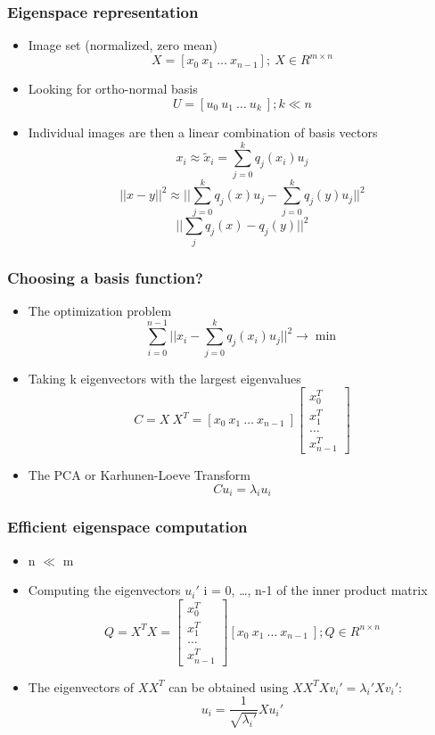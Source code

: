 \documentclass[10pt]{beamer}
\begin{document}
\begin{frame}
  \frametitle{Eigenspace representation}
  \begin{itemize}
  \item Image set (normalized, zero mean)
    \[ X = [ x_0 ~ x_1 ~ \ldots ~  x_{n-1} ] ; ~ X \in R^{m \times n} \]
  \item Looking for ortho-normal basis
    \[ U = [ u_0 ~ u_1 ~ \ldots ~ u_k ~ ] ; k \ll n \]
  \item Individual images are then a linear combination of basis vectors
    \[ x_i \approx \tilde{x}_i = \sum_{j=0}^k q_j(x_i) u_j \]
    \[ || x - y ||^2 \approx || \sum_{j=0}^k q_j(x) u_j -  \sum_{j=0}^k q_j(y) u_j ||^2 \]
    \[  || \sum_j q_j(x) - q_j(y) ||^2 \] 
  \end{itemize}
\end{frame}

\begin{frame}
  \frametitle{Choosing a basis function?}
  \begin{itemize}
  \item The optimization problem
    \[
      \sum_{i=0}^{n-1} || x_i - \sum_{j=0}^k q_j (x_i) u_j ||^2 \rightarrow \min
    \]
  \item Taking k eigenvectors with the largest eigenvalues
    \[
      C = X~X^T = [ x_0 ~ x_1 ~ \ldots ~ x_{n-1} ~]
      \left[ \begin{array}{c} x_0^T \\ x_1^T \\ \ldots \\ x_{n-1}^T \end{array} \right]
    \]
  \item The PCA or Karhunen-Loeve Transform
    \[
      C u_i = \lambda_i u_i
    \]
  \end{itemize}
\end{frame}

\begin{frame}
  \frametitle{Efficient eigenspace computation}
  \begin{itemize}
  \item n $\ll$ m 
  \item Computing the eigenvectors  $u_i'$ i = 0, \ldots, n-1 of the inner product matrix
    \[
      Q = X^T X =
      \left[ \begin{array}{c} x_0^T \\ x_1^T \\ \ldots \\ x_{n-1}^T \end{array} \right]
      [ x_0 ~ x_1 ~ \ldots ~ x_{n-1} ~] ; Q \in R^{n \times n}      
    \]
  \item The eigenvectors of $X X^T$ can be obtained using $X X^T X v_i' = \lambda_i' X v_i'$:
    \[
      u_i = \frac{1}{\sqrt{\lambda_i'}} X u_i'
    \]

  \end{itemize}
\end{frame}
\end{document}
